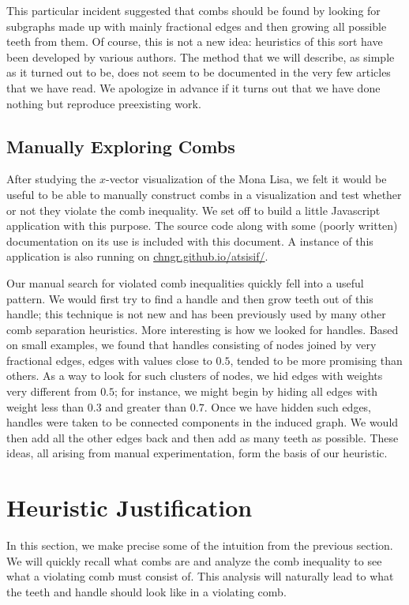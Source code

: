 \documentclass[12pt, letterpaper]{amsart}
\theoremstyle{plain}
\theoremstyle{definition}
\theoremstyle{remark}
\begin{document}
This particular incident suggested that combs should be found by looking for
subgraphs made up with mainly fractional edges and then growing all possible
teeth from them. Of course, this is not a new idea: heuristics of this sort
have been developed by various authors. The method that we will describe, as
simple as it turned out to be, does not seem to be documented in the very few
articles that we have read. We apologize in advance if it turns out that we
have done nothing but reproduce preexisting work.

\subsection{Manually Exploring Combs}
After studying the $x$-vector visualization of the Mona Lisa, we felt it would
be useful to be able to manually construct combs in a visualization and test
whether or not they violate the comb inequality. We set off to build a little
Javascript application with this purpose. The source code along with some
(poorly written) documentation on its use is included with this document. A
instance of this application is also running on \url{chngr.github.io/atsisif/}.

Our manual search for violated comb inequalities quickly fell into a useful
pattern. We would first try to find a handle and then grow teeth out of this
handle; this technique is not new and has been previously used by many other
comb separation heuristics. More interesting is how we looked for handles.
Based on small examples, we found that handles consisting of nodes joined by
very fractional edges, edges with values close to $0.5$, tended to be more
promising than others. As a way to look for such clusters of nodes, we hid
edges with weights very different from $0.5$; for instance, we might begin
by hiding all edges with weight less than $0.3$ and greater than $0.7$. Once
we have hidden such edges, handles were taken to be connected components in the
induced graph. We would then add all the other edges back and then add as many
teeth as possible. These ideas, all arising from manual experimentation, form
the basis of our heuristic.

\section{Heuristic Justification}\label{sec:theory}
In this section, we make precise some of the intuition from the previous
section. We will quickly recall what combs are and analyze the comb inequality
to see what a violating comb must consist of. This analysis will naturally lead
to what the teeth and handle should look like in a violating comb.
\end{document}
